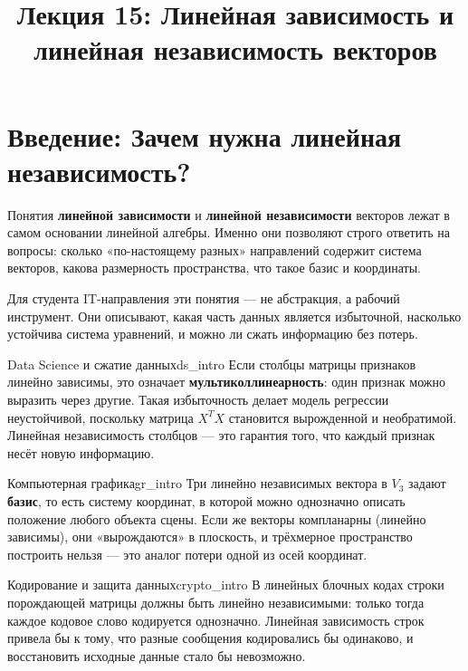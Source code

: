 \documentclass[12pt,a4paper]{article}
\title{Лекция 15: Линейная зависимость и линейная независимость векторов}
\author{}
\date{}
\begin{document}
\maketitle
\thispagestyle{fancy}

\section*{Введение: Зачем нужна линейная независимость?}

Понятия \textbf{линейной зависимости} и \textbf{линейной независимости}
векторов лежат в самом основании линейной алгебры. Именно они позволяют
строго ответить на вопросы: сколько «по-настоящему разных» направлений
содержит система векторов, какова размерность пространства, что такое
базис и координаты.

Для студента IT-направления эти понятия — не абстракция, а рабочий
инструмент. Они описывают, какая часть данных является избыточной,
насколько устойчива система уравнений, и можно ли сжать информацию без
потерь.

\begin{remarkIT}{Data Science и сжатие данных}{ds_intro}
  Если столбцы матрицы признаков линейно зависимы, это означает
  \textbf{мультиколлинеарность}: один признак можно выразить через
  другие. Такая избыточность делает модель регрессии неустойчивой,
  поскольку матрица $X^T X$ становится вырожденной и необратимой.
  Линейная независимость столбцов — это гарантия того, что каждый
  признак несёт новую информацию.
\end{remarkIT}

\begin{remarkIT}{Компьютерная графика}{gr_intro}
  Три линейно независимых вектора в $V_3$ задают \textbf{базис}, то есть
  систему координат, в которой можно однозначно описать положение любого
  объекта сцены. Если же векторы компланарны (линейно зависимы), они
  «вырождаются» в плоскость, и трёхмерное пространство построить нельзя —
  это аналог потери одной из осей координат.
\end{remarkIT}

\begin{remarkIT}{Кодирование и защита данных}{crypto_intro}
  В линейных блочных кодах строки порождающей матрицы должны быть линейно
  независимыми: только тогда каждое кодовое слово кодируется однозначно.
  Линейная зависимость строк привела бы к тому, что разные сообщения
  кодировались бы одинаково, и восстановить исходные данные стало бы
  невозможно.
\end{remarkIT}
\end{document}
